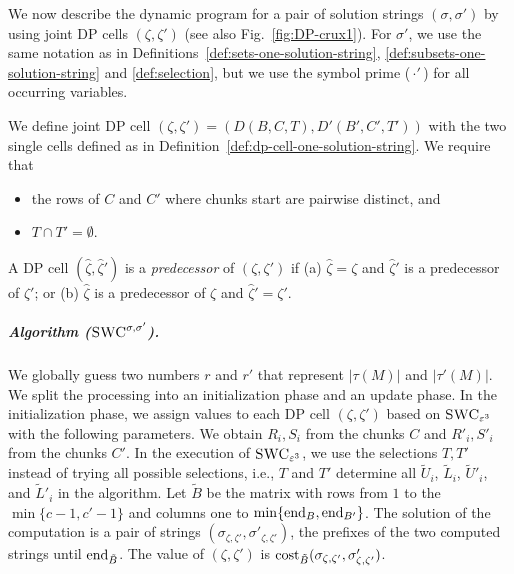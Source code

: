 We now describe the dynamic program for a pair of solution strings $(\sigma, \sigma')$ by using joint DP cells $(\zeta,\zeta')$ (see also Fig.~\ref{fig:DP-crux1}). 
For $\sigma'$, we use the same notation as in Definitions~\ref{def:sets-one-solution-string}, \ref{def:subsets-one-solution-string} and \ref{def:selection}, but we use the symbol prime (\,$\cdot '$\,) for all occurring variables.

\begin{definition}
    We define joint DP cell $(\zeta,\zeta') = (D(B,C,T), D'(B',C',T'))$ with the two single cells defined as in Definition~\ref{def:dp-cell-one-solution-string}. 
    We require that
    \begin{itemize}
        \item the rows of $C$ and $C'$ where chunks start are pairwise distinct, and
        \item $T \cap T' = \emptyset$.
    \end{itemize}
    \label{def:dp-cell-two-solution-string}
\end{definition}
\smallskip


\begin{definition}
    A DP cell $(\hat{\zeta}, \hat{\zeta}')$ is a \emph{predecessor} of $(\zeta, \zeta')$ if (a) $\hat{\zeta} = \zeta$ and $\hat{\zeta}'$ is a predecessor of $\zeta'$; or (b) $\hat{\zeta}$ is a predecessor of $\zeta$ and $\hat{\zeta}' = \zeta'$.
    \label{def:predecessor-two}
\end{definition}

\subparagraph{Algorithm ($\textsc{SWC}^{\sigma, \sigma'}$).}
We globally guess two numbers $r$ and $r'$ that represent $|\tau(M)|$ and $|\tau'(M)|$.
We split the processing into an initialization phase and an update phase.
In the initialization phase, we assign values to each DP cell  $(\zeta,\zeta')$ based on $\textsc{SWC}_{\varepsilon^3}$ with the following parameters.
We obtain $R_i, S_i$ from the chunks $C$ and $R'_i,S'_i$ from the chunks $C'$.
In the execution of $\textsc{SWC}_{\varepsilon^3}$, we use the selections $T,T'$ instead of trying all possible selections, i.e., $T$ and $T'$ determine all $\tilde{U}_i$, $\tilde{L}_i$, $\tilde{U}'_i$, and $\tilde{L}'_i$ in the algorithm.
Let $\tilde{B}$ be the matrix with rows from $1$ to the $\min\{c - 1,c' - 1\}$ and columns one to $\min\{\textrm{end}_B, \textrm{end}_{B'}\}$.
The solution of the computation is a pair of strings $(\sigma_{\zeta,\zeta'},\sigma'_{\zeta,\zeta'})$, the prefixes of the two computed strings until $\textrm{end}_{\tilde{B}}$.
The value of $(\zeta,\zeta')$ is $\mathrm{cost}_{\tilde{B}}(\sigma_{\zeta,\zeta'},\sigma'_{\zeta,\zeta'})$.

